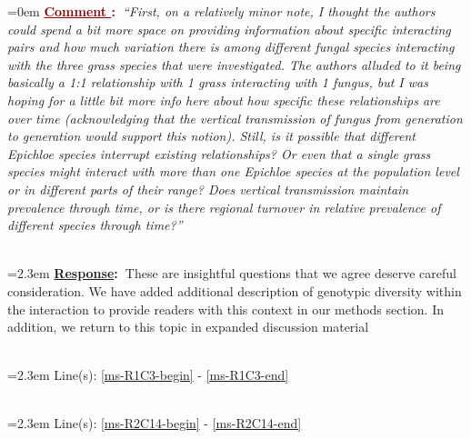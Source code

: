 \documentclass[12pt]{article}
\newcounter{cN}
\newcommand{\comment}[1]{
	\vspace{2em}
	\refstepcounter{cN} %
	\noindent \hangindent=0em \textbf{\textcolor{Maroon}{\uline{Comment \thecN}:~}}\emph{``#1''}
	}
\newcommand{\response}[1]{
	\\[0.25em]
	\hangindent=2.3em \textbf{\textcolor{NavyBlue}{\uline{Response}:~}}#1
	}
\newcommand{\linesref}[2]{
		\\[0.25em]
	\hangindent=2.3em {\color{Mahogany} Line(s): \ref{#1} - \ref{#2}}
}
\begin{document}
 \comment{First, on a relatively minor note, I thought the authors could spend a bit more space on providing information about specific interacting pairs and how much variation there is among different fungal species interacting with the three grass species that were investigated. The authors alluded to it being basically a 1:1 relationship with 1 grass interacting with 1 fungus, but I was hoping for a little bit more info here about how specific these relationships are over time (acknowledging that the vertical transmission of fungus from generation to generation would support this notion). Still, is it possible that different Epichloe species interrupt existing relationships? Or even that a single grass species might interact with more than one Epichloe species at the population level or in different parts of their range? Does vertical transmission maintain prevalence through time, or is there regional turnover in relative prevalence of different species through time?}
\response{These are insightful questions that we agree deserve careful consideration. We have added additional description of genotypic diversity within the interaction to provide readers with this context in our methods section. In addition, we return to this topic in expanded discussion material}
\linesref{ms-R1C3-begin}{ms-R1C3-end}
\linesref{ms-R2C14-begin}{ms-R2C14-end}
\end{document}
